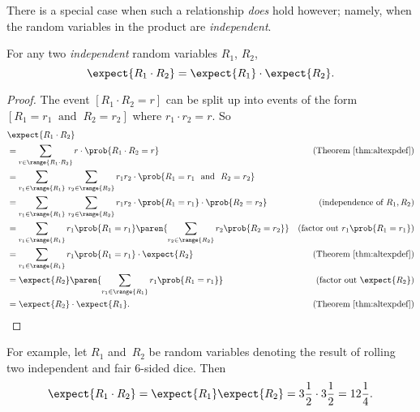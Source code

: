 There is a special case when such a relationship \emph{does} hold
however; namely, when the random variables in the product are
\emph{independent}.

\begin{theorem}\label{th:prod}
For any two \emph{independent} random variables $R_1$, $R_2$,
\[
\expect{R_1 \cdot R_2} = \expect{R_1} \cdot \expect{R_2}.
\]
\end{theorem}

\begin{proof}
The event $[R_1 \cdot R_2=r]$ can be split up into events of the form
$[R_1 = r_1\ \text{ and }\ R_2 = r_2]$ where $r_1\cdot r_2=r$.  So
\begingroup
\openup\jot
\begin{align*}
\lefteqn{\expect{R_1 \cdot R_2}}\\
& = \sum_{r \in \range{R_1\cdot R_2}} r\cdot \prob{R_1\cdot R_2=r}
                    &\text{(Theorem~\ref{thm:altexpdef})} \\
& =      \sum_{r_1 \in \range{R_1}} \, \sum_{r_2 \in \range{R_2}}
            r_1 r_2 \cdot \prob{R_1=r_1\ \text{ and }\ R_2=r_2} \\
& =      \sum_{r_1 \in \range{R_1}} \, \sum_{r_2 \in \range{R_2}}
            r_1 r_2 \cdot \prob{R_1=r_1}\cdot \prob{R_2=r_2}
                    &\text{(independence of $R_1,R_2$)}\\
& =      \sum_{r_1 \in \range{R_1}} r_1\prob{R_1=r_1}
              \paren{\sum_{r_2 \in \range{R_2}} r_2 \prob{R_2=r_2}}
                    &\text{(factor out $r_1\prob{R_1=r_1}$)}\\
& =      \sum_{r_1 \in \range{R_1}} r_1\prob{R_1=r_1} \cdot \expect{R_2}
                    &\text{(Theorem~\ref{thm:altexpdef})}\\
& =       \expect{R_2} \paren{ \sum_{r_1 \in \range{R_1}} r_1\prob{R_1=r_1}}
                    &\text{(factor out $\expect{R_2}$)}\\
& =       \expect{R_2} \cdot  \expect{R_1}.
                    &\text{(Theorem~\ref{thm:altexpdef})}
\end{align*}
\endgroup
\end{proof}

For example, let $R_1$ and~$R_2$ be random variables denoting the
result of rolling two independent and fair 6-sided dice.  Then
\begin{equation*}
\expect{R_1 \cdot R_2}
    = \expect{R_1} \expect{R_2} 
    = 3\frac{1}{2} \cdot 3\frac{1}{2} 
    = 12\frac{1}{4}.
\end{equation*}


